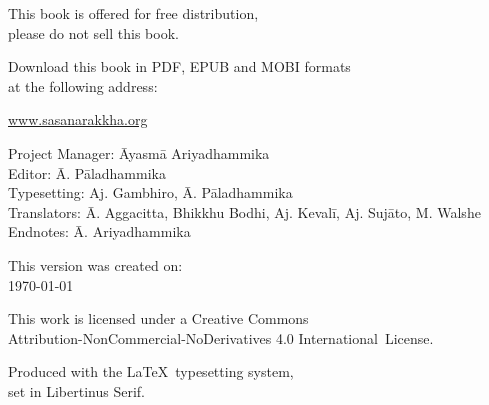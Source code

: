 \cleartoverso
\thispagestyle{empty}

\vspace*{-\baselineskip}

{%

\fontsize{9}{11}\selectfont
\centering
\setlength{\parindent}{0pt}%
\setlength{\parskip}{0.8\baselineskip}%


This book is offered for free distribution,\\
please do not sell this book.

Download this book in PDF, EPUB and MOBI formats\\
at the following address:

\href{https://sasanarakkha.org/}{www.sasanarakkha.org}

\vfill


Project Manager: Āyasmā Ariyadhammika\\
Editor: Ā. Pāladhammika\\
Typesetting: Aj. Gambhiro, Ā. Pāladhammika\\
Translators: Ā. Aggacitta, Bhikkhu Bodhi, Aj. Kevalī, Aj. Sujāto, M. Walshe\\
Endnotes: Ā. Ariyadhammika


\vfill

This version was created on:\\
\today\\
\currenttime

\vfill

This work is licensed under a Creative Commons\\
Attribution-NonCommercial-NoDerivatives 4.0 International~License.

Produced with the \LaTeX\ typesetting system,\\
set in Libertinus Serif.

\theEditionInfo

}

